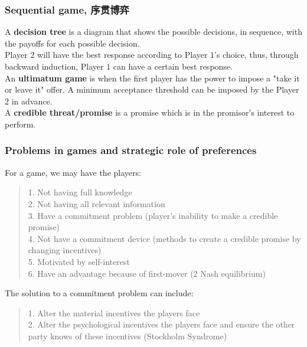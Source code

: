 \subsubsection{Sequential game, 序贯博弈}
A \textbf{decision tree} is a diagram that shows the possible decisions, in sequence, with the payoffs for each possible decision. \\
Player $2$ will have the best response according to Player $1$'s choice, thus, through backward induction, Player $1$ can have a certain best response. \\
An \textbf{ultimatum game} is when the first player has the power to impose a "take it or leave it" offer. A minimum acceptance threshold can be imposed by the Player $2$ in advance. \\
A \textbf{credible threat/promise} is a promise which is in the promisor's interest to perform.

\subsubsection{Problems in games and strategic role of preferences}
For a game, we may have the players:
\begin{quote}
    1. Not having full knowledge \\
    2. Not having all relevant information \\
    3. Have a commitment problem (player's inability to make a credible promise) \\
    4. Not have a commitment device (methods to create a credible promise by changing incentives) \\
    5. Motivated by self-interest \\
    6. Have an advantage because of first-mover ($2$ Nash equilibrium)
\end{quote}
The solution to a commitment problem can include:
\begin{quote}
    1. Alter the material incentives the players face \\
    2. Alter the psychological incentives the players face and ensure the other party knows of these incentives (Stockholm Syndrome)
\end{quote}

